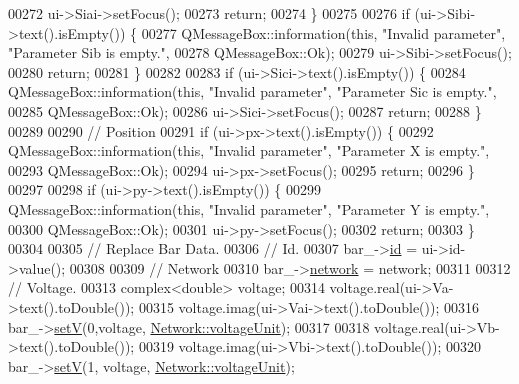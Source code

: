 \begin{DoxyCode}
00272     ui->Siai->setFocus();
00273     \textcolor{keywordflow}{return};
00274   \}
00275 
00276   \textcolor{keywordflow}{if} (ui->Sibi->text().isEmpty()) \{
00277     QMessageBox::information(\textcolor{keyword}{this}, \textcolor{stringliteral}{"Invalid parameter"}, \textcolor{stringliteral}{"Parameter Sib is empty."},
00278                              QMessageBox::Ok);
00279     ui->Sibi->setFocus();
00280     \textcolor{keywordflow}{return};
00281   \}
00282 
00283   \textcolor{keywordflow}{if} (ui->Sici->text().isEmpty()) \{
00284     QMessageBox::information(\textcolor{keyword}{this}, \textcolor{stringliteral}{"Invalid parameter"}, \textcolor{stringliteral}{"Parameter Sic is empty."},
00285                              QMessageBox::Ok);
00286     ui->Sici->setFocus();
00287     \textcolor{keywordflow}{return};
00288   \}
00289 
00290   \textcolor{comment}{// Position}
00291   \textcolor{keywordflow}{if} (ui->px->text().isEmpty()) \{
00292     QMessageBox::information(\textcolor{keyword}{this}, \textcolor{stringliteral}{"Invalid parameter"}, \textcolor{stringliteral}{"Parameter X is empty."},
00293                              QMessageBox::Ok);
00294     ui->px->setFocus();
00295     \textcolor{keywordflow}{return};
00296   \}
00297 
00298   \textcolor{keywordflow}{if} (ui->py->text().isEmpty()) \{
00299     QMessageBox::information(\textcolor{keyword}{this}, \textcolor{stringliteral}{"Invalid parameter"}, \textcolor{stringliteral}{"Parameter Y is empty."},
00300                              QMessageBox::Ok);
00301     ui->py->setFocus();
00302     \textcolor{keywordflow}{return};
00303   \}
00304 
00305   \textcolor{comment}{// Replace Bar Data.}
00306   \textcolor{comment}{// Id.}
00307   bar\_->\hyperlink{class_bar_a9dc5c6a6d44fe412ae34ef8a881b8dce}{id} = ui->id->value();
00308 
00309   \textcolor{comment}{// Network}
00310   bar\_->\hyperlink{class_bar_a80025f13884750add58cc61b318357ff}{network} = network;
00311 
00312   \textcolor{comment}{// Voltage.}
00313   complex<double> voltage;
00314   voltage.real(ui->Va->text().toDouble());
00315   voltage.imag(ui->Vai->text().toDouble());
00316   bar\_->\hyperlink{group___models_ga9b6fbc92674bfcdc9d5090795ab335a6}{setV}(0,voltage, \hyperlink{group___graphics_gacde031ef95f5c05565ee35769f2ed89e}{Network::voltageUnit});
00317 
00318   voltage.real(ui->Vb->text().toDouble());
00319   voltage.imag(ui->Vbi->text().toDouble());
00320   bar\_->\hyperlink{group___models_ga9b6fbc92674bfcdc9d5090795ab335a6}{setV}(1, voltage, \hyperlink{group___graphics_gacde031ef95f5c05565ee35769f2ed89e}{Network::voltageUnit});

\end{DoxyCode}
